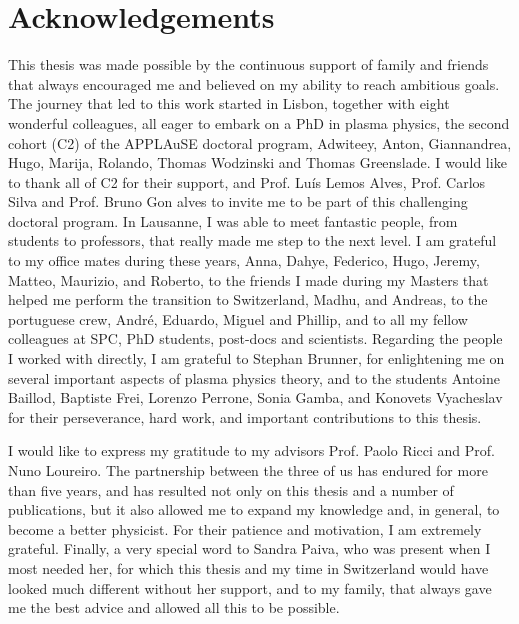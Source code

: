 \chapter*{Acknowledgements}

This thesis was made possible by the continuous support of family and friends that always encouraged me and believed on my ability to reach ambitious goals.
%
The journey that led to this work started in Lisbon, together with eight wonderful colleagues, all eager to embark on a PhD in plasma physics, the second cohort (C2) of the APPLAuSE doctoral program, Adwiteey, Anton, Giannandrea, Hugo, Marija, Rolando, Thomas Wodzinski and Thomas Greenslade.
%
I would like to thank all of C2 for their support, and Prof. Luís Lemos Alves, Prof. Carlos Silva and Prof. Bruno Gon alves to invite me to be part of this challenging doctoral program.
%
In Lausanne, I was able to meet fantastic people, from students to professors, that really made me step to the next level.
%
I am grateful to my office mates during these years, Anna, Dahye, Federico, Hugo, Jeremy, Matteo, Maurizio,  and Roberto, to the friends I made during my Masters that helped me perform the transition to Switzerland, Madhu, and Andreas, to the portuguese crew, André, Eduardo, Miguel and Phillip, and to all my fellow colleagues at SPC, PhD students, post-docs and scientists.
%
Regarding the people I worked with directly, I am grateful to Stephan Brunner, for enlightening me on several important aspects of plasma physics theory, and to the students Antoine Baillod, Baptiste Frei, Lorenzo Perrone, Sonia Gamba, and Konovets Vyacheslav for their perseverance, hard work, and important contributions to this thesis.

I would like to express my gratitude to my advisors Prof. Paolo Ricci and Prof. Nuno Loureiro.
%
The partnership between the three of us has endured for more than five years, and has resulted not only on this thesis and a number of publications, but it also allowed me to expand my knowledge and, in general, to become a better physicist.
%
For their patience and motivation, I am extremely grateful.
%
Finally, a very special word to Sandra Paiva, who was present when I most needed her, for which this thesis  and my time in Switzerland would have looked much different without her support, and to my family, that always gave me the best advice and allowed all this to be possible.

